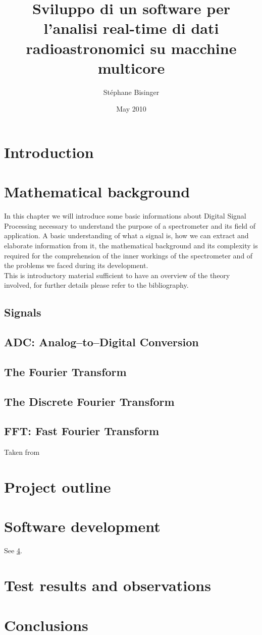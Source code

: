 \documentclass[a4paper,11pt,twoside,openright]{unibo}
\begin{document}
\title{Sviluppo di un software per l'analisi real-time di dati
radioastronomici su macchine multicore}
\author{St\'ephane Bisinger}
\date{May 2010}

\maketitle
%

\tableofcontents

\chapter*{Introduction}
\label{intro}
\chapter{Mathematical background}
\label{math_bkg}
In this chapter we will introduce some basic informations about Digital Signal
Processing necessary to understand the purpose of a spectrometer and its field
of application. A basic understanding of what a signal is, how we can extract
and elaborate information from it, the mathematical background and its
complexity is required for the comprehension of the inner workings of the
spectrometer and of the problems we faced during its development.\\
This is introductory material sufficient to have an overview of
the theory involved, for further details please refer to the
bibliography.
\section{Signals}
\section{ADC: Analog--to--Digital Conversion}
\section{The Fourier Transform}
\section{The Discrete Fourier Transform}
\section{FFT: Fast Fourier Transform}
Taken from \cite{bertoni}
\chapter{Project outline}
\label{outline}
\chapter{Software development}
\label{sw_devel}
See \ref{tests}.
\chapter{Test results and observations}
\label{tests}
\chapter{Conclusions}
\label{conclusions}


\end{document}

